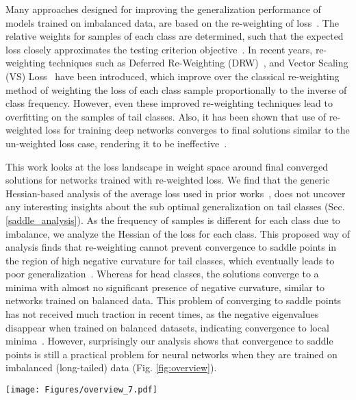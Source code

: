 \documentclass{article}
\begin{document}
 Many approaches designed for improving the generalization performance of models trained on imbalanced data, are based on the re-weighting of loss~\cite{cui2019class}. The relative weights for samples of each class are determined, such that the expected loss closely approximates the testing criterion objective~\cite{cao2019learning}. In recent years, re-weighting techniques such as Deferred Re-Weighting (DRW)~\cite{cao2019learning}, and Vector Scaling (VS) Loss~\cite{kini2021label} have been introduced, which improve over the classical re-weighting method of weighting the loss of each class sample proportionally to the inverse of class frequency. However, even these improved re-weighting techniques lead to overfitting on the samples of tail classes. Also, it has been shown that use of re-weighted loss for training deep networks converges to final solutions similar to the un-weighted loss case, rendering it to be ineffective~\cite{byrd2019effect}.


This work looks at the loss landscape in weight space around final converged solutions for networks trained with re-weighted loss. We find that the generic Hessian-based analysis of the average loss used in prior works~\cite{pmlr-v97-ghorbani19b, foret2021sharpnessaware}, does not uncover any interesting insights about the sub optimal generalization on tail classes (Sec. \ref{saddle_analysis}). As the frequency of samples is different for each class due to imbalance, we analyze the Hessian of the loss for each class. This proposed way of analysis finds that re-weighting cannot prevent convergence to saddle points in the region of high negative curvature for tail classes, which eventually leads to poor generalization~\cite{dauphin2014identifying}. Whereas for head classes, the solutions converge to a minima with almost no significant presence of negative curvature, similar to networks trained on balanced data. This problem of converging to saddle points has not received much traction in recent times, as the negative eigenvalues disappear when trained on balanced datasets, indicating convergence to local minima~\cite{chaudhari2019entropy, pmlr-v97-ghorbani19b}. However, surprisingly our analysis shows that convergence to saddle points is still a practical problem for neural networks when they are trained on imbalanced (long-tailed) data (Fig. \ref{fig:overview}).


\begin{figure*}[!t]
  \centering
  \texttt{[image: Figures/overview\_7.pdf]}
  \caption{
With class-wise Hessian analysis of loss, we observe that when deep neural networks are trained on class-imbalanced datasets, the final solution for tail classes reach a region of large negative curvature indicating convergence to saddle point (bottom), whereas the head classes converge to a minima (top). The properties of the loss landscape (saddle points or minima) can be observed by analyzing eigen spectral density (centre). \protect\footnotemark{} }
  \label{fig:overview}
\vspace{-1em}
\end{figure*}
\end{document}

